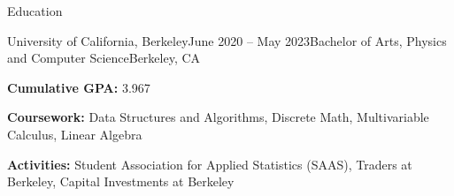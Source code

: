 \documentclass{resume} %
\begin{document}

\begin{rSection}{Education}
    \begin{rSubsection}{University of California, Berkeley}{June 2020 – May 2023}{Bachelor of Arts, Physics and Computer Science}{Berkeley, CA}
        \item {\bf Cumulative GPA:} 3.967
        \item {\bf Coursework:} Data Structures and Algorithms, Discrete Math, Multivariable Calculus, Linear Algebra
        \item {\bf Activities:} Student Association for Applied Statistics (SAAS), Traders at Berkeley, Capital Investments at Berkeley
        \end{rSubsection}
    \end{rSection}

\end{document}
